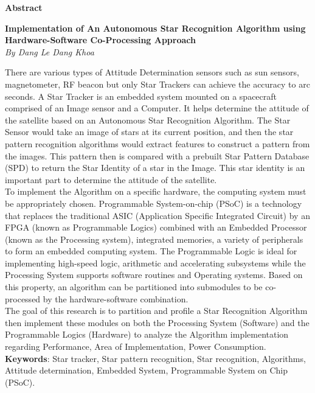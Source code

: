 \begin{center}
	\textbf{\large Abstract}
\end{center}

\begin{center}
	\textbf{Implementation of An Autonomous Star Recognition Algorithm using Hardware-Software Co-Processing Approach} \\
	\emph{By Dang Le Dang Khoa}
\end{center}

\noindent There are various types of Attitude Determination sensors such as sun sensors, magnetometer, RF beacon but only Star Trackers can achieve the accuracy to arc seconds. A Star Tracker is an embedded system mounted on a spacecraft comprised of an Image sensor and a Computer. It helps determine the attitude of the satellite based on an Autonomous Star Recognition Algorithm. The Star Sensor would take an image of stars at its current position, and then the star pattern recognition algorithms would extract features to construct a pattern from the images. This pattern then is compared with a prebuilt Star Pattern Database (SPD) to return the Star Identity of a star in the Image. This star identity is an important part to determine the attitude of the satellite. \\

\noindent To implement the Algorithm on a specific hardware, the computing system must be appropriately chosen. Programmable System-on-chip (PSoC) is a technology that replaces the traditional ASIC (Application Specific Integrated Circuit) by an FPGA (known as Programmable Logics) combined with an Embedded Processor (known as the Processing system), integrated memories, a variety of peripherals to form an embedded computing system. The Programmable Logic is ideal for implementing high-speed logic, arithmetic and accelerating subsystems while the Processing System supports software routines and Operating systems. Based on this property, an algorithm can be partitioned into submodules to be co-processed by the hardware-software combination. \\

\noindent The goal of this research is to partition and profile a Star Recognition Algorithm then implement these modules on both the Processing System (Software) and the Programmable Logics (Hardware) to analyze the Algorithm implementation regarding Performance, Area of Implementation, Power Consumption. \\

\noindent \textbf{Keywords}: Star tracker, Star pattern recognition, Star recognition, Algorithms, Attitude determination, Embedded System, Programmable System on Chip (PSoC).
